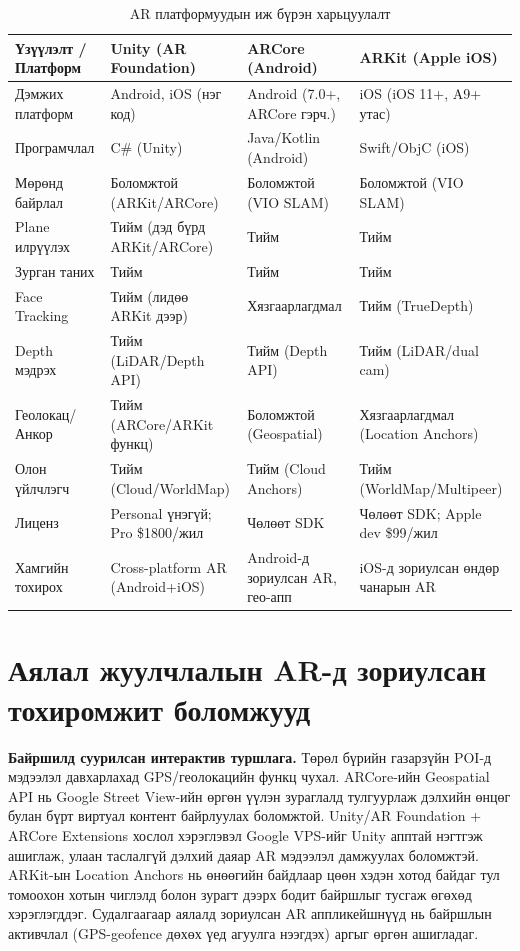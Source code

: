 \begin{sloppy}
\begin{table}[H]
\centering
\caption{AR платформуудын иж бүрэн харьцуулалт}
\label{tab:ar-platform-full}
\small
\begin{tabular}{|p{3cm}|p{3.5cm}|p{3.5cm}|p{3.5cm}|}
\hline
\textbf{Үзүүлэлт / Платформ} & \textbf{Unity (AR Foundation)} & \textbf{ARCore (Android)} & \textbf{ARKit (Apple iOS)} \\ \hline
Дэмжих платформ & Android, iOS (нэг код) & Android (7.0+, ARCore гэрч.) & iOS (iOS 11+, A9+ утас) \\ \hline
Програмчлал & C\# (Unity) & Java/Kotlin (Android) & Swift/ObjC (iOS) \\ \hline
Мөрөнд байрлал & Боломжтой (ARKit/ARCore) & Боломжтой (VIO SLAM) & Боломжтой (VIO SLAM) \\ \hline
Plane илрүүлэх & Тийм (дэд бүрд ARKit/ARCore) & Тийм & Тийм \\ \hline
Зурган таних & Тийм & Тийм & Тийм \\ \hline
Face Tracking & Тийм (лидөө ARKit дээр) & Хязгаарлагдмал & Тийм (TrueDepth) \\ \hline
Depth мэдрэх & Тийм (LiDAR/Depth API) & Тийм (Depth API) & Тийм (LiDAR/dual cam) \\ \hline
Геолокац/Анкор & Тийм (ARCore/ARKit функц) & Боломжтой (Geospatial) & Хязгаарлагдмал (Location Anchors) \\ \hline
Олон үйлчлэгч & Тийм (Cloud/WorldMap) & Тийм (Cloud Anchors) & Тийм (WorldMap/Multipeer) \\ \hline
Лиценз & Personal үнэгүй; Pro \$1800/жил & Чөлөөт SDK & Чөлөөт SDK; Apple dev \$99/жил \\ \hline
Хамгийн тохирох & Cross-platform AR (Android+iOS) & Android-д зориулсан AR, гео-апп & iOS-д зориулсан өндөр чанарын AR \\ \hline
\end{tabular}
\end{table}

\section*{Аялал жуулчлалын AR-д зориулсан тохиромжит боломжууд}

\textbf{Байршилд суурилсан интерактив туршлага.} Төрөл бүрийн газарзүйн POI-д мэдээлэл давхарлахад GPS/геолокацийн функц чухал. ARCore-ийн Geospatial API нь Google Street View-ийн өргөн үүлэн зураглалд тулгуурлаж дэлхийн өнцөг булан бүрт виртуал контент байрлуулах боломжтой. Unity/AR Foundation + ARCore Extensions хослол хэрэглэвэл Google VPS-ийг Unity апптай нэгтгэж ашиглаж, улаан таслалгүй дэлхий даяар AR мэдээлэл дамжуулах боломжтэй. ARKit-ын Location Anchors нь өнөөгийн байдлаар цөөн хэдэн хотод байдаг тул томоохон хотын чиглэлд болон зурагт дээрх бодит байршлыг тусгаж өгөхөд хэрэглэгддэг. Судалгаагаар аялалд зориулсан AR аппликейшнүүд нь байршлын активчлал (GPS-geofence дөхөх үед агуулга нээгдэх) аргыг өргөн ашигладаг.


\end{sloppy}
